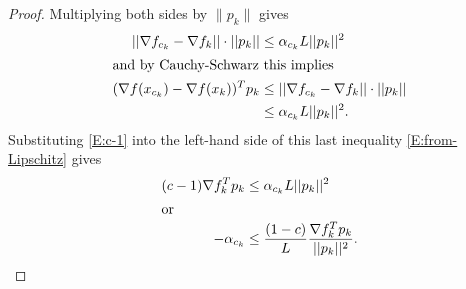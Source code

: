 \begin{proof}
Multiplying both sides by $\lVert p_k \rVert$ gives
\begin{align}
|| \nabla f_{c_k} - \nabla f_k || \cdot ||p_k || &\leq \alpha_{c_k} L || p_k ||^2 \notag \\
\intertext{and by Cauchy-Schwarz this implies}
( \nabla f(x_{c_k}) - \nabla f(x_k) )^T p_k & \leq || \nabla f_{c_k} - \nabla f_k || \cdot ||p_k || \label{E:from-Lipschitz} \\ 
	&\leq \alpha_{c_k} L || p_k ||^2. \notag
\end{align}
Substituting \eqref{E:c-1} into the left-hand side of this last inequality \eqref{E:from-Lipschitz} gives
\begin{align}
( c - 1 ) \nabla f_k^T p_k &\leq \alpha_{c_k} L || p_k ||^2 \notag\\
\intertext{or}
-\alpha_{c_k} &\leq \frac{( 1 - c )}{L} \frac{ \nabla f_k^T p_k}{ || p_k ||^2}. \label{E:-alpha}
\end{align}



\end{proof}
